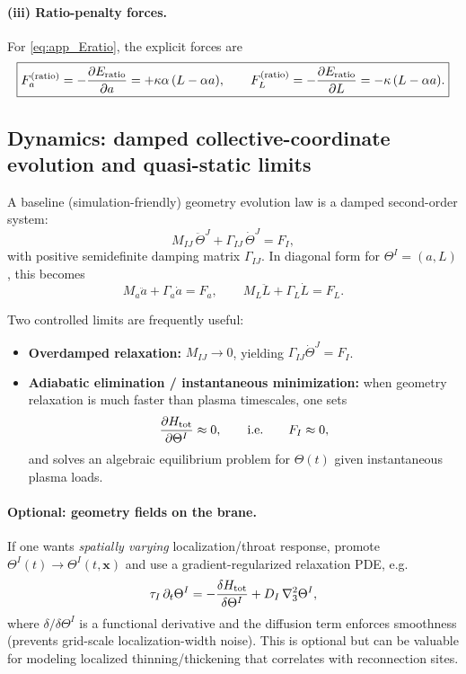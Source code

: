 \documentclass[11pt]{article}
\begin{document}
\paragraph{(iii) Ratio-penalty forces.}
For \eqref{eq:app_Eratio}, the explicit forces are
\begin{equation}
\boxed{
F_a^{({\rm ratio})} = -\frac{\partial E_{\rm ratio}}{\partial a}
= +\kappa\alpha\,(L-\alpha a),
\qquad
F_L^{({\rm ratio})} = -\frac{\partial E_{\rm ratio}}{\partial L}
= -\kappa\,(L-\alpha a).
}
\label{eq:app_ratio_forces}
\end{equation}

\subsection{Dynamics: damped collective-coordinate evolution and quasi-static limits}
\label{app:geom_dynamics}

A baseline (simulation-friendly) geometry evolution law is a damped second-order system:
\begin{equation}
\boxed{
M_{IJ}\,\ddot\Theta^J + \Gamma_{IJ}\,\dot\Theta^J = F_I,
}
\label{eq:app_geom_eom_general}
\end{equation}
with positive semidefinite damping matrix \(\Gamma_{IJ}\). In diagonal form for \(\Theta^I=(a,L)\),
this becomes
\begin{equation}
M_a \ddot a + \Gamma_a \dot a = F_a,
\qquad
M_L \ddot L + \Gamma_L \dot L = F_L.
\end{equation}

Two controlled limits are frequently useful:
\begin{itemize}[leftmargin=1.7em]
\item \textbf{Overdamped relaxation:} \(M_{IJ}\to 0\), yielding \(\Gamma_{IJ}\dot\Theta^J = F_I\).
\item \textbf{Adiabatic elimination / instantaneous minimization:} when geometry relaxation is much faster
than plasma timescales, one sets
\begin{equation}
\frac{\partial H_{\rm tot}}{\partial \Theta^I}\approx 0,
\qquad\text{i.e.}\qquad F_I\approx 0,
\end{equation}
and solves an algebraic equilibrium problem for \(\Theta(t)\) given instantaneous plasma loads.
\end{itemize}

\paragraph{Optional: geometry fields on the brane.}
If one wants \emph{spatially varying} localization/throat response, promote
\(\Theta^I(t)\to \Theta^I(t,\mathbf{x})\) and use a gradient-regularized relaxation PDE,
e.g.
\begin{equation}
\tau_I\,\partial_t \Theta^I
=
-\frac{\delta H_{\rm tot}}{\delta \Theta^I}
+ D_I\,\nabla_3^2 \Theta^I,
\label{eq:app_geom_field_relax}
\end{equation}
where \(\delta/\delta\Theta^I\) is a functional derivative and the diffusion term enforces
smoothness (prevents grid-scale localization-width noise). This is optional but can be valuable
for modeling localized thinning/thickening that correlates with reconnection sites.
\end{document}
